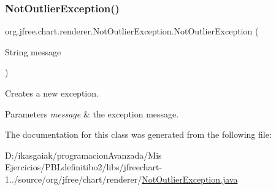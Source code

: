 \subsubsection{\texorpdfstring{Not\+Outlier\+Exception()}{NotOutlierException()}}
{\footnotesize\ttfamily org.\+jfree.\+chart.\+renderer.\+Not\+Outlier\+Exception.\+Not\+Outlier\+Exception (\begin{DoxyParamCaption}\item[{String}]{message }\end{DoxyParamCaption})}

Creates a new exception.


\begin{DoxyParams}{Parameters}
{\em message} & the exception message. \\
\hline
\end{DoxyParams}


The documentation for this class was generated from the following file\+:\begin{DoxyCompactItemize}
\item 
D\+:/ikasgaiak/programacion\+Avanzada/\+Mis Ejercicios/\+P\+B\+Ldefinitibo2/libs/jfreechart-\/1../source/org/jfree/chart/renderer/\mbox{\hyperlink{_not_outlier_exception_8java}{Not\+Outlier\+Exception.\+java}}\end{DoxyCompactItemize}
